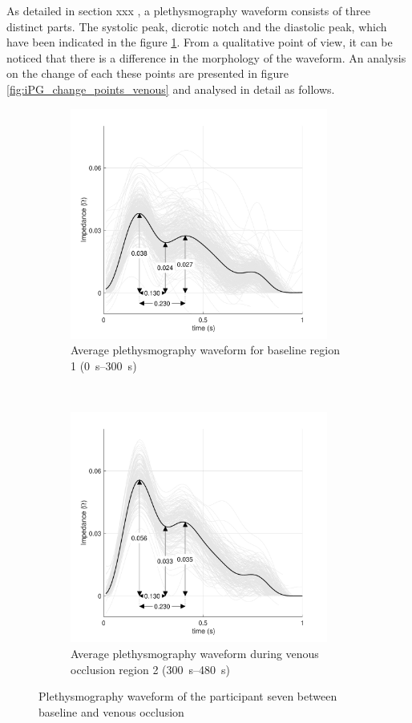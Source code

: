 As detailed in section xxx , a plethysmography waveform consists of three distinct parts. The systolic peak, dicrotic notch and the diastolic peak, which have been indicated in the figure \ref{fig:iPG_venous_baseline}. From a qualitative point of view, it can be noticed that there is a difference in the morphology of the waveform. An analysis on the change of each these points are presented in figure \ref{fig:iPG_change_points_venous} and analysed in detail as follows.

\begin{figure}[!htbp]
	\centering
	\begin{subfigure}[t]{0.5\textwidth}
		\centering
		\includegraphics[height=7.6cm]{figure6a}
		\caption{Average plethysmography waveform for baseline region 1 (\SIrange{0}{300}{\second})}
		\label{fig:iPG_venous_baseline}
	\end{subfigure}%
	~ 
	\begin{subfigure}[t]{0.5\textwidth}
		\centering
		\includegraphics[height=7.6cm]{figure6b}
		\caption{Average plethysmography waveform during venous occlusion region 2 (\SIrange{300}{480}{\second})}
		\label{fig:iPG_venous_occlusion}
	\end{subfigure}
	\caption{Plethysmography waveform of the participant seven between baseline and venous occlusion}
	\label{fig:iPG_venous}
\end{figure}

